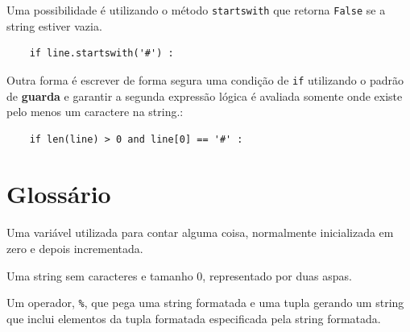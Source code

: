 {%

Uma possibilidade é utilizando o método {\tt startswith} que retorna
{\tt False} se a string estiver vazia.

\beforeverb
\begin{verbatim}
    if line.startswith('#') :
\end{verbatim}
\afterverb
%

Outra forma é escrever de forma segura uma condição de {\tt if} utilizando o
padrão de {\bf guarda} e garantir a segunda expressão lógica é avaliada
somente onde existe pelo menos um caractere na string.:

\beforeverb
\begin{verbatim}
    if len(line) > 0 and line[0] == '#' :
\end{verbatim}
\afterverb
%

\section{Glossário}

\begin{descrição}
\item[contador:] Uma variável utilizada para contar alguma coisa, normalmente
	inicializada em zero e depois incrementada.

\item[string vazia:] Uma string sem caracteres e tamanho 0, representado por
	duas aspas.

\item[operador format:] Um operador, {\tt \%}, que pega uma string formatada
	e uma tupla gerando um string que inclui elementos da tupla formatada
	especificada pela string formatada.


\end{descrição}}
